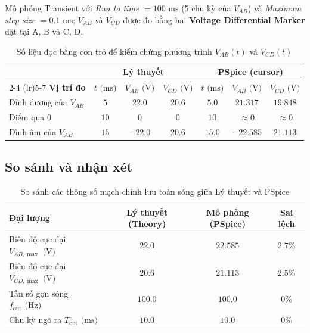 \noindent Mô phỏng Transient với \textit{Run to time} $= 100\text{ ms}$ (5 chu kỳ của $V_{AB}$) và \textit{Maximum step size} $= 0.1\text{ ms}$; $V_{AB}$ và $V_{CD}$ được đo bằng hai \textbf{Voltage Differential Marker} đặt tại A, B và C, D.

\simresult
{}

\begin{table}[H]
  \centering
  \caption{Số liệu đọc bằng con trỏ để kiểm chứng phương trình $V_{AB}(t)$ và $V_{CD}(t)$}
  \begin{tabular}{lcccccc}
    \toprule
    & \multicolumn{3}{c}{\textbf{Lý thuyết}} & \multicolumn{3}{c}{\textbf{PSpice (cursor)}} \\
    \cmidrule(lr){2-4} \cmidrule(lr){5-7}
    \textbf{Vị trí đo} & $t\text{ (ms)}$ & $V_{AB}\text{ (V)}$ & $V_{CD}\text{ (V)}$ & $t\text{ (ms)}$ & $V_{AB}\text{ (V)}$ & $V_{CD}\text{ (V)}$ \\
    \midrule
    Đỉnh dương của $V_{AB}$ & $5$  & $22.0$  & $20.6$ & $5.0$ & $21.317$ & $19.848$ \\
    Điểm qua $0$            & $10$ & $0$     & $0$    & $10$ & $\approx 0$ & $\approx 0$ \\
    Đỉnh âm của $V_{AB}$    & $15$ & $-22.0$ & $20.6$ & $15.0$ & $-22.585$ & $21.113$ \\
    \bottomrule
  \end{tabular}
\end{table}

\subsection{So sánh và nhận xét}
\begin{table}[H]
  \centering
  \caption{So sánh các thông số mạch chỉnh lưu toàn sóng giữa Lý thuyết và PSpice}
  \begin{tabular}{lccc}
    \toprule
    \textbf{Đại lượng} & \textbf{Lý thuyết (Theory)} & \textbf{Mô phỏng (PSpice)} & \textbf{Sai lệch} \\
    \midrule
    Biên độ cực đại $V_{AB,\max}\text{ (V)}$ & $22.0$ & $22.585$ & $2.7\%$ \\
    Biên độ cực đại $V_{CD,\max}\text{ (V)}$ & $20.6$ & $21.113$ & $2.5\%$ \\
    Tần số gợn sóng $f_{\text{out}}\text{ (Hz)}$ & $100.0$ & $100.0$ & $0\%$ \\
    Chu kỳ ngõ ra $T_{\text{out}}\text{ (ms)}$   & $10.0$ & $10.0$ & $0\%$ \\
    \bottomrule
  \end{tabular}
\end{table}


